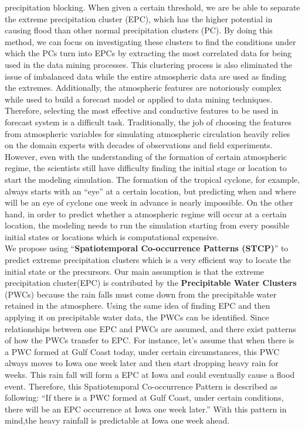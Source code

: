 \documentclass{acm_proc_article-sp}
\begin{document}
precipitation blocking. When given a certain threshold, we are be able to
separate the extreme precipitation cluster (EPC), which has the higher potential
in causing flood than other normal precipitation clusters (PC). By doing this method, we can
focus on investigating these clusters to find the conditions under which the PCs
turn into EPCs by extracting the most correlated data for being used in the data
mining processes. This clustering process is also eliminated the issue of imbalanced data while the entire atmospheric data are used as finding the extremes.
\newline Additionally, the atmospheric features are notoriously complex
while used to build a forecast model or applied to data mining techniques.
Therefore, selecting the most effective and conductive features to be used in
forecast system is a difficult task. Traditionally, the job of choosing the
features from atmospheric variables for simulating atmospheric circulation
heavily relies on the domain experts with decades of observations and field
experiments.
\cite{:/content/aip/magazine/physicstoday/article/65/3/10.1063/PT.3.1475}
However, even with the understanding of the formation of certain atmospheric
regime, the scientists still have difficulty finding the initial stage or location
to start the modeling simulation. The formation of the tropical
cyclone, for example, always starts with an ``eye'' at a certain location, but predicting when and where will be an eye of cyclone one week in advance is nearly impossible. On the other hand, in order to predict whether a atmospheric regime will occur at a certain location, the modeling needs to run the simulation starting from every possible initial states or locations which is computational expensive. \cite{stensrud2000using} 
\\We propose using ``\textbf{Spatiotemporal Co-occurrence Patterns (STCP)}'' to predict extreme precipitation clusters which is a very efficient way to locate the initial state or the precursors. Our main assumption is that the extreme precipitation cluster(EPC) is contributed by the \textbf{Precipitable Water Clusters} (PWCs) because the rain falls must come down from the precipitable water retained in the atmosphere. Using the same idea of finding EPC and then applying it on precipitable water data, the PWCs can be identified. Since relationships between one EPC and PWCs are assumed, and there exist patterns of how the PWCs transfer to EPC.  For instance, let's assume that when there is a PWC formed at Gulf Coast today, under certain circumstances, this PWC always moves to Iowa one week later and then start dropping heavy rain for weeks. This rain fall will form a EPC at Iowa and could eventually cause a flood event. Therefore, this Spatiotemporal Co-occurrence Pattern is described as following: ``If there is a PWC formed at Gulf Coast, under certain conditions, there will be an EPC occurrence at Iowa one week later.'' With this pattern in mind,the heavy rainfall is predictable at Iowa one week ahead.
\end{document}
